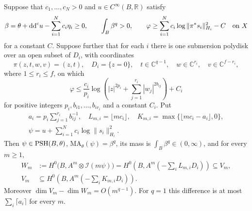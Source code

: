 \begin{theorem}\label{thm:fiber-integrability-band}\label{thm:crossing-fiber-integrability-band}\label{cor:semipositive-fiber-band}
Suppose that $c_1,\ldots,c_N>0$ and $u\in C^\infty(B,\mathbb R)$ satisfy
\[
 \beta=\theta+\mathrm{dd}^{\mathrm{c}} u-\sum_{i=1}^Nc_i\eta_i\geq0,
 \qquad\int_B\beta^q>0,
 \qquad \varphi\geq\sum_{i=1}^Nc_i\log\|\pi^*s_i\|_{H_i}^2-C
                         \quad\hbox{on }X
\]
for a constant $C$. Suppose further that for each $i$ there is one submersion polydisk over an open subset of $D_i$, with coordinates
\[
 \pi(z,t,w,v)=(z,t),\quad D_i=\{z=0\},\quad
 t\in\mathbb C^{q-1},\quad w\in\mathbb C^{r_i},\quad v\in\mathbb C^{f-r_i},
\]
where $1\leq r_i\leq f$, on which
\[
 \varphi\leq\frac{c_i}{p_i}\log\left(|z|^{2p_i}+\sum_{j=1}^{r_i}|w_j|^{2b_{ij}}\right)+C_i
\]
for positive integers $p_i,b_{i1},\ldots,b_{ir_i}$ and a constant $C_i$. Put
\[
 \begin{gathered}
 a_i=p_i\sum_{j=1}^{r_i}b_{ij}^{-1},\quad
 L_{m,i}=\lfloor mc_i\rfloor,\quad
 K_{m,i}=\max\{\lfloor mc_i-a_i\rfloor,0\},\\
 \psi=u+\sum_{i=1}^Nc_i\log\|s_i\|_{H_i}^2.
 \end{gathered}
\]
Then $\psi\in\mathrm{PSH}(B,\theta)$, $\mathrm{MA}_\theta(\psi)=\beta^q$, its mass is $\int_B\beta^q\in(0,\infty)$, and for every $m\geq1$,
\[
 \begin{split}
 W_m&:=H^0\bigl(B,A^m\otimes\mathcal I(m\psi)\bigr)
      =H^0\left(B,A^m\left(-\sum_iL_{m,i}D_i\right)\right)\subseteq V_m,\\
 V_m&\subseteq H^0\left(B,A^m\left(-\sum_iK_{m,i}D_i\right)\right).
 \end{split}
\]
Moreover $\dim V_m-\dim W_m=O(m^{q-1})$. For $q=1$ this difference is at most $\sum_i\lceil a_i\rceil$ for every $m$.
\end{theorem}
